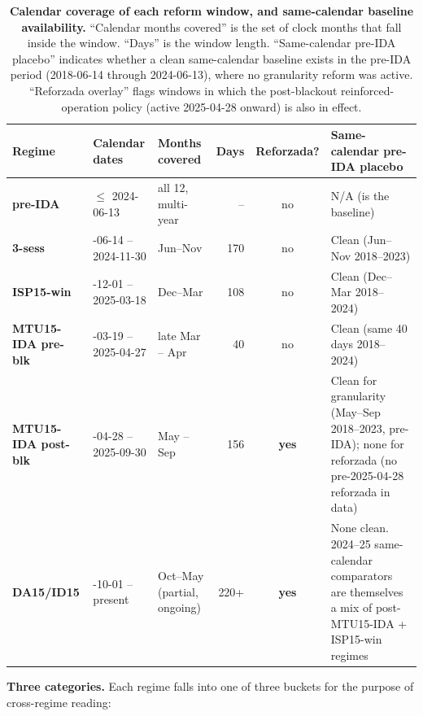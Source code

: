 \documentclass[11pt,a4paper]{article}
\begin{document}
\begin{table}[H]
\centering
\caption{\textbf{Calendar coverage of each reform window, and same-calendar baseline availability.} ``Calendar months covered'' is the set of clock months that fall inside the window. ``Days'' is the window length. ``Same-calendar pre-IDA placebo'' indicates whether a clean same-calendar baseline exists in the pre-IDA period (2018-06-14 through 2024-06-13), where no granularity reform was active. ``Reforzada overlay'' flags windows in which the post-blackout reinforced-operation policy (active 2025-04-28 onward) is also in effect.}
\label{tab:calendar_coverage}
\setlength{\tabcolsep}{4pt}
\scriptsize
\begin{tabular}{@{}>{\raggedright\arraybackslash}p{2.4cm} >{\raggedright\arraybackslash}p{2.6cm} >{\raggedright\arraybackslash}p{2.1cm} r c >{\raggedright\arraybackslash}p{4.4cm}@{}}
\toprule
\textbf{Regime} & \textbf{Calendar dates} & \textbf{Months covered} & \textbf{Days} & \textbf{Reforzada?} & \textbf{Same-calendar pre-IDA placebo} \\
\midrule
\textbf{pre-IDA} & $\le$ 2024-06-13 & all 12, multi-year & -- & no & N/A (is the baseline) \\
\textbf{3-sess} & 2024-06-14 -- 2024-11-30 & Jun--Nov & 170 & no & Clean (Jun--Nov 2018--2023) \\
\textbf{ISP15-win} & 2024-12-01 -- 2025-03-18 & Dec--Mar & 108 & no & Clean (Dec--Mar 2018--2024) \\
\textbf{MTU15-IDA pre-blk} & 2025-03-19 -- 2025-04-27 & late Mar -- Apr & 40 & no & Clean (same 40 days 2018--2024) \\
\textbf{MTU15-IDA post-blk} & 2025-04-28 -- 2025-09-30 & May -- Sep & 156 & \textbf{yes} & Clean for granularity (May--Sep 2018--2023, pre-IDA); none for reforzada (no pre-2025-04-28 reforzada in data) \\
\textbf{DA15/ID15} & 2025-10-01 -- present & Oct--May (partial, ongoing) & 220+ & \textbf{yes} & None clean. 2024--25 same-calendar comparators are themselves a mix of post-MTU15-IDA + ISP15-win regimes \\
\bottomrule
\end{tabular}
\end{table}

\noindent\textbf{Three categories.} Each regime falls into one of three buckets for the purpose of cross-regime reading:
\end{document}
